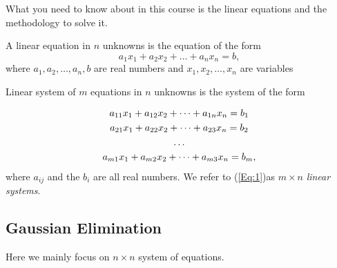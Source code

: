 What you need to know about in this course is the linear equations and the methodology to solve it.

\begin{definition}
A linear equation in $n$ unknowns is the equation of the form
\[
a_1x_1 + a_2x_2 +\dots + a_nx_n = b,
\]
where $a_1,a_2,\dots,a_n,b$ are real numbers and $x_1,x_2,\dots,x_n$ are variables
\end{definition}

\begin{definition}
Linear system of $m$ equations in $n$ unknowns is the system of the form

\begin{gather}
a_{11}x_1 + a_{12}x_2 + \dots + a_{1n}x_n = b_1 \notag \\ 
a_{21}x_1 + a_{22}x_2 + \dots + a_{23}x_n = b_2 \notag \\
\dots 	\notag 	\\
a_{m1}x_1 + a_{m2}x_2 + \dots + a_{m3}x_n = b_m , \label{Eq:1.1}
\end{gather}
where $a_{ij}$ and the $b_i$ are all real numbers. We refer to (\ref{Eq:1})as $m \times n$ \emph{linear systems}.
\end{definition}

 

\subsection{Gaussian Elimination}

Here we mainly focus on $n \times n$ system of equations. 

